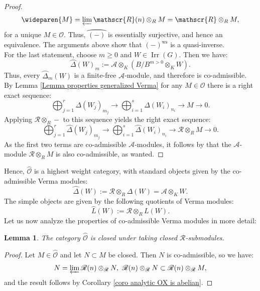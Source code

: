 \documentclass{amsart}
\newtheorem{Lemma}[defi]{Lemma}
\newcommand{\OX}{\mathcal{O}}
\begin{document}
\begin{proof}
\begin{equation*}
    \wideparen{M}=\varprojlim \mathscr{R}(n)\otimes_{R}M=\mathscr{R}\otimes_{R}M,
\end{equation*}
for a unique $M\in\OX$. Thus, $\wideparen{(-)}$ is essentially surjective, and hence an equivalence. The arguments above show that $(-)^{\operatorname{ws}}$ is a quasi-inverse.\\
 For the last statement, choose $m\geq 0$ and $W\in\operatorname{Irr}(G)$. Then we have:
\begin{equation*}
    \wideparen{\Delta}(W)_m:=\mathscr{A}\otimes_K(B/B^{m>0}\otimes_K W).
\end{equation*}
Thus, every  $\wideparen{\Delta}_m(W)$ is a finite-free $\mathscr{A}$-module, and therefore is co-admissible. By Lemma \ref{Lemma properties generalized Verma} for any $M\in\OX$ there is a right exact sequence:
\begin{equation*}
    \bigoplus_{j=1}^r\Delta(W_j)_{m_j}\rightarrow \bigoplus_{i=1}^s\Delta(W_i)_{n_i}\rightarrow M\rightarrow 0.
\end{equation*}
Applying $\mathscr{R}\otimes_{R}-$ to this sequence yields the right exact sequence:
\begin{equation*}
    \bigoplus_{j=1}^r\wideparen{\Delta}(W_j)_{m_j}\rightarrow \bigoplus_{i=1}^s\wideparen{\Delta}(W_i)_{n_i}\rightarrow \mathscr{R}\otimes_{R}M\rightarrow 0.
\end{equation*}
As the first two terms are co-admissible $\mathscr{A}$-modules, it follows by \cite[Corollary 3.4]{schneider2002algebras} that the $\mathscr{A}$-module $\mathscr{R}\otimes_{R}M$ is also co-admissible, as wanted. 
\end{proof}
Hence, $\wideparen{\OX}$ is a highest weight category, with standard objects given by the co-admissible Verma modules:
\begin{equation*}
    \wideparen{\Delta}(W):=\mathscr{R}\otimes_{R}\Delta(W)=\mathscr{A}\otimes_KW.
\end{equation*}
 The simple objects are given by the following quotients of Verma modules:
\begin{equation*}
    \wideparen{L}(W):=\mathscr{R}\otimes_{R}L(W).
\end{equation*}
Let us now analyze the properties of co-admissible Verma modules in more detail:
\begin{Lemma}\label{Lemma closed under subobjects}
The category $\wideparen{\OX}$ is closed under taking closed $\mathscr{R}$-submodules.
\end{Lemma}
\begin{proof}
Let $M\in \wideparen{\OX}$ and let $N\subset M$ be closed. Then $N$ is co-admissible, so we have:
\begin{equation*}
N=\varprojlim \mathscr{R}(n)\otimes_{\mathscr{R}}N, \textnormal{  }    \mathscr{R}(n)\otimes_{\mathscr{R}}N\subset \mathscr{R}(n)\otimes_{\mathscr{R}}M,
\end{equation*}
and the result follows by Corollary \ref{coro analytic OX is abelian}.
\end{proof}
\end{document}
